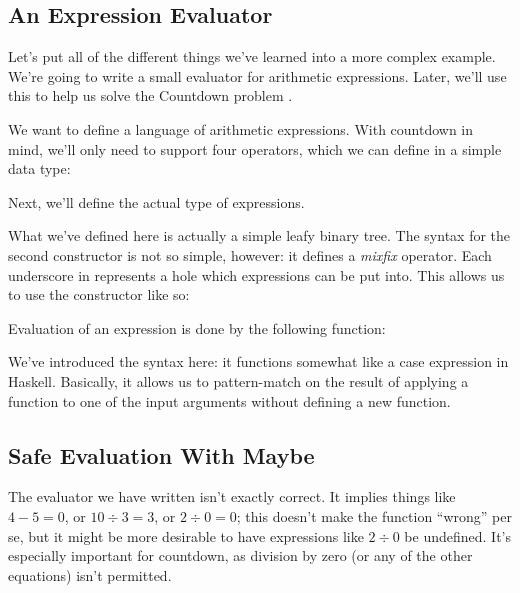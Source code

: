 \subsection{An Expression Evaluator}
Let's put all of the different things we've learned into a more complex example.
We're going to write a small evaluator for arithmetic expressions.
Later, we'll use this to help us solve the Countdown problem
\citep{huttonCountdownProblem2002}.

We want to define a language of arithmetic expressions.
With countdown in mind, we'll only need to support four operators, which we can
define in a simple data type:
\begin{agdalisting}
\end{agdalisting}
Next, we'll define the actual type of expressions.
\begin{agdalisting}
\end{agdalisting}
What we've defined here is actually a simple leafy binary tree.
The syntax for the second constructor is not so simple, however: it defines a
\emph{mixfix} operator.
Each underscore in \AgdaInductiveConstructor{\(\_\langle \_ \rangle\_\)}
represents a hole which expressions can be put into.
This allows us to use the constructor like so:
\begin{agdalisting*}
\end{agdalisting*}

Evaluation of an expression is done by the following function:
\begin{agdalisting}
\end{agdalisting}
We've introduced the  syntax here: it functions somewhat like
a case expression in Haskell.
Basically, it allows us to pattern-match on the result of applying a function to
one of the input arguments without defining a new function.
\subsection{Safe Evaluation With Maybe}
The evaluator we have written isn't exactly correct.
It implies things like \(4 - 5 = 0\), or \(10 \div 3 = 3\), or \(2 \div 0 = 0\);
this doesn't make the function ``wrong'' per se, but it might be more desirable
to have expressions like \(2 \div 0\) be undefined.
It's especially important for countdown, as division by zero (or any of the
other equations) isn't permitted.

